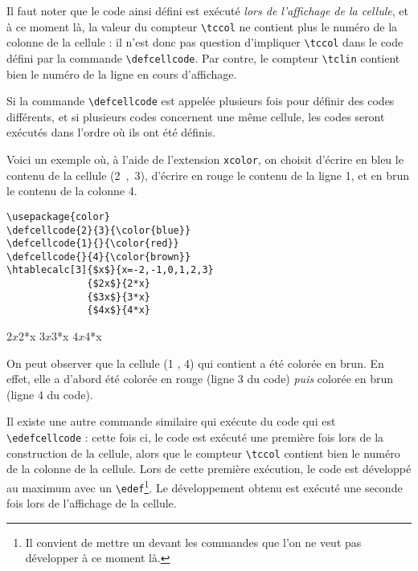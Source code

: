 \documentclass[a4paper,10pt]{article}
\newcommand\verbinline{\lstinline[breaklines=false,basicstyle=\normalsize\ttfamily]}
\newcommand\mywidth{0.85\linewidth}
\begin{document}
Il faut noter que le code ainsi défini est exécuté \emph{lors de l'affichage de la cellule}, et à ce moment là, la valeur du compteur \verbinline|\tccol| ne contient plus le numéro de la colonne de la cellule : il n'est donc pas question d'impliquer \verbinline|\tccol| dans le code défini par la commande \verbinline|\defcellcode|. Par contre, le compteur \verbinline|\tclin| contient bien le numéro de la ligne en cours d'affichage.

Si la commande \verbinline|\defcellcode| est appelée plusieurs fois pour définir des codes différents, et si plusieurs codes concernent une même cellule, les codes seront exécutés dans l'ordre où ils ont été définis.\medskip

Voici un exemple où, à l'aide de l'extension \verb|xcolor|, on choisit d'écrire en bleu le contenu de la cellule (2~,~3), d'écrire en rouge le contenu de la ligne 1, et en brun le contenu de la colonne 4.
\begin{center}
\begin{minipage}{\mywidth}
\begin{lstlisting}
\usepackage{color}
\defcellcode{2}{3}{\color{blue}}
\defcellcode{1}{}{\color{red}}
\defcellcode{}{4}{\color{brown}}
\htablecalc[3]{$x$}{x=-2,-1,0,1,2,3}
              {$2x$}{2*x}
              {$3x$}{3*x}
              {$4x$}{4*x}
\end{lstlisting}
\end{minipage}

              {$2x$}{2*x}
              {$3x$}{3*x}
              {$4x$}{4*x}
\end{center}

On peut observer que la cellule (1 , 4) qui contient {\color{brown}} a été colorée en brun. En effet, elle a d'abord été colorée en rouge (ligne 3 du code) \emph{puis} colorée en brun (ligne 4 du code).\bigskip

Il existe une autre commande similaire qui exécute du code qui est \verbinline|\edefcellcode| : cette fois ci, le code est exécuté une première fois lors de la construction de la cellule, alors que le compteur \verbinline|\tccol| contient bien le numéro de la colonne de la cellule. Lors de cette première exécution, le code est développé au maximum avec un \verbinline|\edef|\footnote{Il convient de mettre un \texttt{\string\noexpand} devant les commandes que l'on ne veut pas développer à ce moment là.}. Le développement obtenu est exécuté une seconde fois lors de l'affichage de la cellule.\medskip
\end{document}
